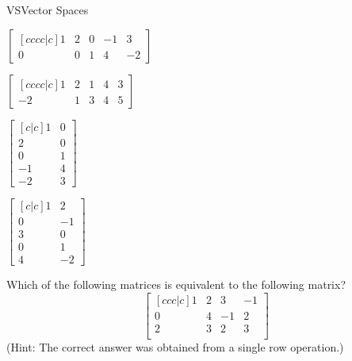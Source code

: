 \documentclass{article}
\begin{document}
\begin{module}{VS}{Vector Spaces}
\begin{readinessAssuranceTest}
\begin{multicols}{3}
\begin{readinessAssuranceTestChoices}
\item \(
      \begin{bmatrix}[cccc|c]
        1 & 2 & 0 & -1 & 3 \\
        0 & 0 & 1 & 4 & -2
      \end{bmatrix}
    \) %
\item \(
      \begin{bmatrix}[cccc|c]
        1 & 2 & 1 & 4 & 3 \\
        -2 & 1 & 3 & 4 & 5
      \end{bmatrix}
    \)
\item \(
      \begin{bmatrix}[c|c]
        1 & 0 \\
        2 & 0 \\
        0 & 1 \\
        -1 & 4 \\
        -2 & 3
      \end{bmatrix}
    \)
\item \(
      \begin{bmatrix}[c|c]
        1 & 2 \\
        0 & -1 \\
        3 & 0 \\
        0 & 1 \\
        4 & -2
      \end{bmatrix}
    \)

\end{readinessAssuranceTestChoices}
\end{multicols}

\item Which of the following matrices is equivalent to the following matrix?
  \[
    \begin{bmatrix}[ccc|c]
      1 & 2 & 3 & -1 \\
      0 & 4 & -1 & 2 \\
      2 & 3 & 2 & 3 \\
    \end{bmatrix}
  \]
  (Hint: The correct answer was obtained from a single row operation.)


\end{readinessAssuranceTest}
\end{module}
\end{document}
